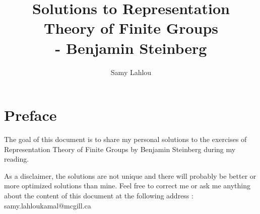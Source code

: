 \documentclass[12pt, oneside]{book}
\title{Solutions to Representation Theory of Finite Groups
\\ - Benjamin Steinberg}
\author{Samy Lahlou}
\newcounter{exercise}[chapter] %
\begin{document}
\maketitle

\chapter*{Preface}

The goal of this document is to share my personal solutions to the exercises of Representation Theory of Finite Groups by Benjamin Steinberg during my reading.

As a disclaimer, the solutions are not unique and there will probably be better or more optimized solutions than mine. Feel free to correct me or ask me anything about the content of this document at the following address : samy.lahloukamal@mcgill.ca

\tableofcontents




\end{document}
